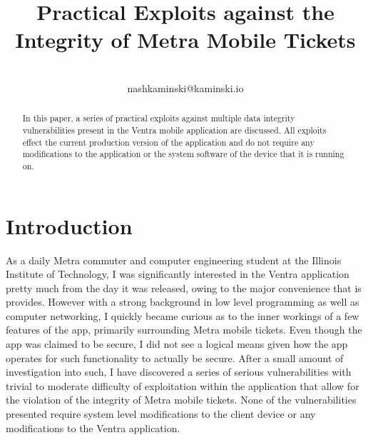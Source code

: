 \documentclass[12pt,conference]{IEEEtran}
\begin{document}
%
\title{Practical Exploits against the Integrity of Metra Mobile Tickets}

\author{\\
nashkaminski@kaminski.io\\
}


\maketitle


\begin{abstract}
In this paper, a series of practical exploits against multiple data integrity vulnerabilities present in the Ventra mobile application are discussed. All exploits effect the current production version of the application and do not require any modifications to the application or the system software of the device that it is running on.
\end{abstract}




\section{Introduction}
As a daily Metra commuter and computer engineering student at the Illinois Institute of Technology, I was significantly interested in the Ventra application pretty much from the day it was released, owing to the major convenience that is provides. However with a strong background in low level programming as well as computer networking, I quickly became curious as to the inner workings of a few features of the app, primarily surrounding Metra mobile tickets. Even though the app was claimed to be secure, I did not see a logical means given how the app operates for such functionality to actually be secure. After a small amount of investigation into such, I have discovered a series of serious vulnerabilities with trivial to moderate difficulty of exploitation within the application that allow for the violation of the integrity of Metra mobile tickets. None of the vulnerabilities presented require system level modifications to the client device or any modifications to the Ventra application.
\end{document}
